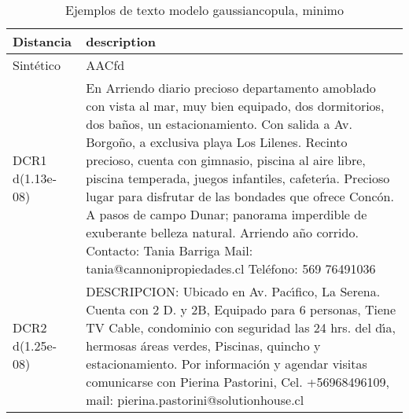 \begin{table}[H]
\centering
\fontsize{10}{14}\selectfont
\caption{Ejemplos de texto modelo gaussiancopula, minimo}
\label{table-example-economicos-a-1-gaussiancopula-min-text}
\begin{tabular}{|l|m{35em}|}
\hline
\rowcolor[gray]{0.8}
Distancia & description \\
\hline Sintético & AACfd \\
\hline DCR1 d(1.13e-08) & En Arriendo diario precioso departamento amoblado con vista al mar, muy bien equipado, dos dormitorios, dos ba\~nos, un estacionamiento. Con salida a Av. Borgo\~no, a exclusiva playa Los Lilenes. Recinto precioso, cuenta con gimnasio, piscina al aire libre, piscina temperada, juegos infantiles, cafeter{\'\i}a. Precioso lugar para disfrutar de las bondades que ofrece Conc\'on. A pasos de campo Dunar; panorama imperdible de exuberante belleza natural. Arriendo a\~no corrido.  Contacto: Tania Barriga Mail: tania@cannonipropiedades.cl Tel\'efono: 569 76491036 \\
\hline DCR2 d(1.25e-08) & DESCRIPCION: Ubicado en Av. Pac{\'\i}fico, La Serena. Cuenta con 2 D. y 2B, Equipado para 6 personas, Tiene TV Cable, condominio con seguridad las 24 hrs. del d{\'\i}a, hermosas \'areas verdes, Piscinas, quincho y estacionamiento.  Por informaci\'on y agendar visitas comunicarse con Pierina Pastorini, Cel. +56968496109, mail: pierina.pastorini@solutionhouse.cl \\
\hline
\end{tabular}
\end{table}
